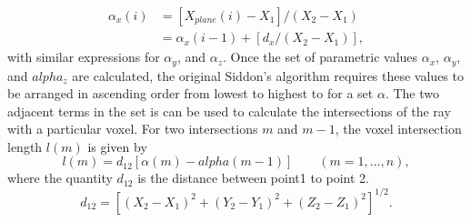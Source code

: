\begin{equation}
\begin{aligned}
\alpha_x(i) &= \left[ X_{plane}(i) - X_1 \right] / (X_2 - X_1) \\
			&=\alpha_x(i-1) + \left[ d_x / (X_2 - X_1) \right],
\end{aligned}
\label{ea:siddon_alphas}
\end{equation}
with similar expressions for $\alpha_y$, and $\alpha_z$.  Once the set of parametric values $\alpha_x$, $\alpha_y$, and $alpha_z$ are calculated, the original Siddon's algorithm requires these values to be arranged in ascending order from lowest to highest to for a set ${\alpha}$.  The two adjacent terms in the set is can be used to calculate the intersections of the ray with a particular voxel.  For two intersections $m$ and $m-1$, the voxel intersection length $l(m)$ is given by 
\begin{equation}
l(m) = d_{12} \left[ \alpha(m) - alpha(m-1) \right] \qquad (m = 1, ..., n),
\label{eq:siddon_length}
\end{equation}
where the quantity $d_{12}$ is the distance between point1 to point 2.
\begin{equation}
d_{12} = \left[ (X_2 - X_1)^2 + (Y_2 - Y_1)^2 + (Z_2 - Z_1)^2 \right]^{1/2}.
\label{eq:siddon_d12}
\end{equation}


